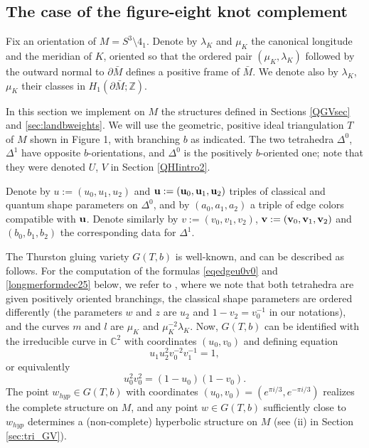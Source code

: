 \documentclass[11pt]{amsart}
\newcommand{\mc}{\mathbb{C}}
\newcommand{\mz}{\mathbb{Z}}
\newcommand{\bu}{{\bf u}}
\newcommand{\bv}{{\bf v}}
\begin{document}
{\subsection{The case of the figure-eight knot complement}\label{4_1} Fix an orientation of $M=S^3\setminus 4_1$. Denote by $\lambda_{K}$ and $\mu_{K}$ the canonical longitude and the meridian of $K$, oriented so that the ordered pair $(\mu_K,\lambda_K)$ followed by the outward normal to $\partial \bar{M}$ defines a positive frame of $\bar{M}$. We denote also by $\lambda_K$, $\mu_K$ their classes in $H_1(\partial \bar M; \mz)$.

In this section we implement on $M$ the structures defined in Sections \ref{QGVsec} and \ref{sec:landbweights}. We will use the geometric, positive ideal triangulation $T$ of $M$ shown in Figure 1, with branching $b$ as indicated. The two tetrahedra $\Delta^0$, $\Delta^1$ have opposite $b$-orientations, and $\Delta^0$ is the positively $b$-oriented one; note that they were denoted $U$, $V$ in Section \ref{QHIintro2}.

Denote by $u:=(u_0,u_1,u_2)$ and $\bu:=(\bu_0,\bu_1,\bu_2)$ triples of classical and quantum shape parameters on $\Delta^0$, and by $(a_0,a_1,a_2)$ a triple of edge colors compatible with $\bu$. Denote similarly by $v:=(v_0,v_1,v_2)$, $\bv:=(\bv_0,\bv_1,\bv_2)$ and $(b_0,b_1,b_2)$ the corresponding data for $\Delta^1$. 

The Thurston gluing variety $G(T,b)$ is well-known, and can be described as follows. For the computation of the formulas \eqref{eqedgeu0v0} and \eqref{longmerformdec25} below, we refer to \cite[Section 15.1.4]{Martelli}, where we note that both tetrahedra are given positively oriented branchings, the classical shape parameters are ordered differently (the parameters $w$ and $z$ are $u_2$ and $1-v_2 = v_0^{-1}$ in our notations), and the curves $m$ and $l$ are $\mu_K$ and $\mu_K^{-2}\lambda_K$. Now, $G(T,b)$ can be identified with the irreducible curve in $\mc^2$ with coordinates $(u_0,v_0)$ and defining equation 
$$u_1u_2^2v_0^{-2}v_1^{-1}=1,$$
or equivalently
\begin{equation}\label{eqedgeu0v0}
u_0^2v_0^2=(1-u_0)(1-v_0).
\end{equation}
The point $w_{hyp}\in G(T,b)$ with coordinates $(u_0,v_0)=(e^{\pi i/3}, e^{-\pi i/3})$ realizes the complete structure on $M$, and any point $w\in G(T,b)$ sufficiently close to $w_{hyp}$ determines a (non-complete) hyperbolic structure on $M$ (see (ii) in Section \ref{sec:tri_GV}). 

}
\end{document}
